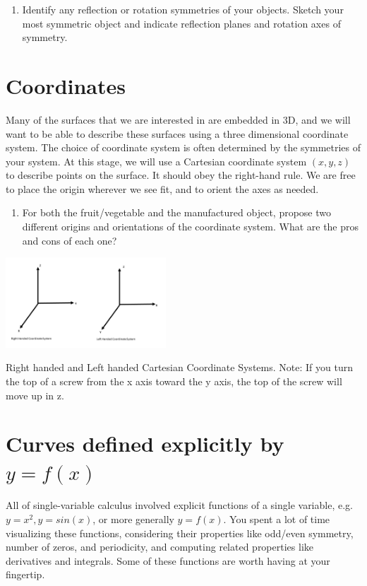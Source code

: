 \documentclass{tufte-handout}
\begin{document}
\begin{enumerate}[resume]
\item Identify any reflection or rotation symmetries of your objects.  Sketch your most symmetric object and indicate reflection planes and rotation axes of symmetry.
\end{enumerate}

\section{Coordinates}

Many of the surfaces that we are interested in are embedded in 3D, and we will want to be able to describe these surfaces using a three dimensional coordinate system.  The choice of coordinate system is often determined by the symmetries of your system. At this stage, we will use a Cartesian coordinate system $(x,y,z)$ to describe points on the surface. It should obey the right-hand rule. We are free to place the origin wherever we see fit, and to orient the axes as needed.

\begin{enumerate}[resume]
\item For both the fruit/vegetable and the manufactured object, propose two different origins and orientations of the coordinate system.  What are the pros and cons of each one?
\end{enumerate}

\begin{marginfigure}
\includegraphics[width=6cm]{figs/LHandRHCoord}
\caption{Right handed and Left handed Cartesian Coordinate Systems.  Note:  If you turn the top of a screw from the x axis toward the y axis, the top of the screw will move up in z.}
\end{marginfigure}

\section{Curves defined explicitly by $y=f(x)$}

All of single-variable calculus involved explicit functions of a single variable, e.g. $y = x^2, y = sin(x)$, or more generally $y = f(x)$. You spent a lot of time visualizing these functions, considering their properties like odd/even symmetry, number of zeros, and periodicity, and computing related properties like derivatives and integrals. Some of these functions are worth having at your fingertip.
\end{document}
